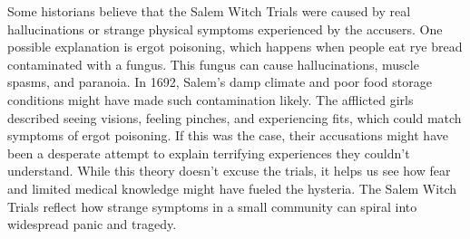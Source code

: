 \documentclass[12pt]{article}
\begin{document}
\vspace{1em}

\begin{tcolorbox}[colframe=black!60, colback=white, 
coltitle=black, colbacktitle=black!15, fonttitle=\bfseries\Large, 
title=Source 2: Real Hallucinations and Fear of the Unknown, halign title=center, left=10pt, right=10pt, top=10pt, bottom=15pt]
Some historians believe that the Salem Witch Trials were caused by real hallucinations or strange physical symptoms experienced by the accusers. One possible explanation is ergot poisoning, which happens when people eat rye bread contaminated with a fungus. This fungus can cause hallucinations, muscle spasms, and paranoia. In 1692, Salem’s damp climate and poor food storage conditions might have made such contamination likely. The afflicted girls described seeing visions, feeling pinches, and experiencing fits, which could match symptoms of ergot poisoning. If this was the case, their accusations might have been a desperate attempt to explain terrifying experiences they couldn’t understand. While this theory doesn’t excuse the trials, it helps us see how fear and limited medical knowledge might have fueled the hysteria. The Salem Witch Trials reflect how strange symptoms in a small community can spiral into widespread panic and tragedy.

 
\end{tcolorbox}
\end{document}
